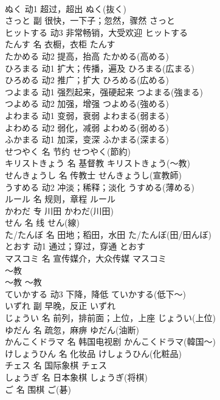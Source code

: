 \documentclass[8pt]{extreport}
\begin{document}
\begin{CJK}{UTF8}{min}
\\	ぬく	动1	超过，超出	ぬく(抜く)	
\\	さっと	副	很快，一下子；忽然，骤然	さっと	
\\	ヒットする	动3	非常畅销，大受欢迎	ヒットする	
\\	たんす	名	衣橱，衣柜	たんす	
\\	たかめる	动2	提高，抬高	たかめる(高める)	
\\	ひろまる	动1	扩大；传播，遍及	ひろまる(広まる)	
\\	ひろめる	动2	推广；扩大	ひろめる(広める)	
\\	つよまる	动1	强烈起来，强硬起来	つよまる(強まる)	
\\	つよめる	动2	加强，增强	つよめる(強める)	
\\	よわまる	动1	变弱，衰弱	よわまる(弱まる)	
\\	よわめる	动2	弱化，减弱	よわめる(弱める)	
\\	ふかまる	动1	加深，变深	ふかまる(深まる)	
\\	せつやく	名	节约	せつやく(節約)	
\\	キリストきょう	名	基督教	キリストきょう(～教)	
\\	せんきょうし	名	传教士	せんきょうし(宣教師)	
\\	うすめる	动2	冲淡；稀释；淡化	うすめる(薄める)	
\\	ルール	名	规则，章程	ルール	
\\	かわだ	专	川田	かわだ(川田)	
\\	せん	名	线	せん(線)	
\\	た/たんぼ	名	田地；稻田，水田	た/たんぼ(田/田んぼ)	
\\	とおす	动1	通过；穿过，穿通	とおす	
\\	マスコミ	名	宣传媒介，大众传媒	マスコミ	
\\	～教	
\\	～教	～教	
\\	ていかする	动3	下降，降低	ていかする(低下～)	
\\	いずれ	副	早晚，反正	いずれ	
\\	じょうい	名	前列，排前面；上位，上座	じょうい(上位)	
\\	ゆだん	名	疏忽，麻痹	ゆだん(油断)	
\\	かんこくドラマ	名	韩国电视剧	かんこくドラマ(韓国～)	
\\	けしょうひん	名	化妆品	けしょうひん(化粧品)	
\\	チェス	名	国际象棋	チェス	
\\	しょうぎ	名	日本象棋	しょうぎ(将棋)	
\\	ご	名	围棋	ご(碁)	

\end{CJK}
\end{document}
